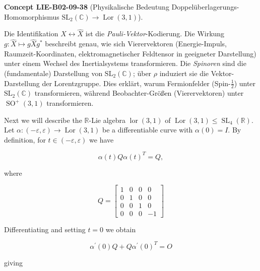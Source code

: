 \documentclass[10pt, letterpaper]{article}
\newcommand{\CustomHeading}[3]{%
  \par\medskip\noindent%
  \textbf{#1 #2} \textnormal{(#3)}.\enskip%
}
\newenvironment{CONC}[2]{\begin{unitbox}\CustomHeading{Concept}{#1}{#2}}{\end{unitbox}}
\begin{document}
\begin{CONC}{LIE-B02-09-38}{Physikalische Bedeutung Doppelüberlagerungs-Homomorphismus \(\mathrm{SL}_2(\mathbb{C})\to \operatorname{Lor}(3,1)\)}
Die Identifikation \(X\leftrightarrow \widehat X\) ist die \emph{Pauli-Vektor}-Kodierung.
Die Wirkung \(g:\widehat X\mapsto g\widehat X g^*\) beschreibt genau, wie sich
Vierervektoren (Energie-Impuls, Raumzeit-Koordinaten, elektromagnetischer Feldtensor in geeigneter Darstellung)
unter einem Wechsel des Inertialsystems transformieren.
Die \emph{Spinoren} sind die (fundamentale) Darstellung von \(\mathrm{SL}_2(\mathbb{C})\);
über \(\rho\) induziert sie die Vektor-Darstellung der Lorentzgruppe.
Dies erklärt, warum Fermionfelder (Spin-\(\tfrac12\)) unter \(\mathrm{SL}_2(\mathbb{C})\)
transformieren, während Beobachter-Größen (Vierervektoren) unter \(\operatorname{SO}^+(3,1)\)
transformieren.
\end{CONC}




Next we will describe the $\mathbb{R}$-Lie algebra $\operatorname{lor}(3,1)$ of $\operatorname{Lor}(3,1) \leqslant \operatorname{SL}_{4}(\mathbb{R})$. Let $\alpha:(-\varepsilon, \varepsilon) \longrightarrow \operatorname{Lor}(3,1)$ be a differentiable curve with $\alpha(0)=I$. By definition, for $t \in(-\varepsilon, \varepsilon)$ we have

$$
\alpha(t) Q \alpha(t)^{T}=Q,
$$

where

$$
Q=\left[\begin{array}{rrrr}
1 & 0 & 0 & 0 \\
0 & 1 & 0 & 0 \\
0 & 0 & 1 & 0 \\
0 & 0 & 0 & -1
\end{array}\right]
$$

Differentiating and setting $t=0$ we obtain

$$
\alpha^{\prime}(0) Q+Q \alpha^{\prime}(0)^{T}=O
$$

giving
\end{document}
